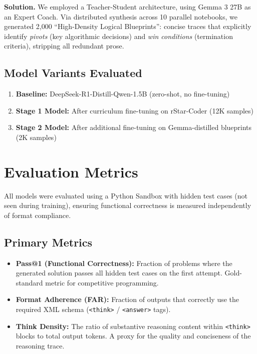 \documentclass[preprint,12pt]{elsarticle}
\begin{document}
\textbf{Solution.} We employed a Teacher-Student architecture, using Gemma 3 27B as an Expert Coach. Via distributed synthesis across 10 parallel notebooks, we generated 2,000 ``High-Density Logical Blueprints'': concise traces that explicitly identify \textit{pivots} (key algorithmic decisions) and \textit{win conditions} (termination criteria), stripping all redundant prose.

\subsection{Model Variants Evaluated}

\begin{enumerate}
    \item \textbf{Baseline:} DeepSeek-R1-Distill-Qwen-1.5B (zero-shot, no fine-tuning)
    \item \textbf{Stage 1 Model:} After curriculum fine-tuning on rStar-Coder (12K samples)
    \item \textbf{Stage 2 Model:} After additional fine-tuning on Gemma-distilled blueprints (2K samples)
\end{enumerate}

\section{Evaluation Metrics}
\label{sec:eval}

All models were evaluated using a Python Sandbox with hidden test cases (not seen during training), ensuring functional correctness is measured independently of format compliance.

\subsection{Primary Metrics}

\begin{itemize}
    \item \textbf{Pass@1 (Functional Correctness):} Fraction of problems where the generated solution passes all hidden test cases on the first attempt. Gold-standard metric for competitive programming.
    \item \textbf{Format Adherence (FAR):} Fraction of outputs that correctly use the required XML schema (\texttt{<think>} / \texttt{<answer>} tags).
    \item \textbf{Think Density:} The ratio of substantive reasoning content within \texttt{<think>} blocks to total output tokens. A proxy for the quality and conciseness of the reasoning trace.
\end{itemize}
\end{document}
